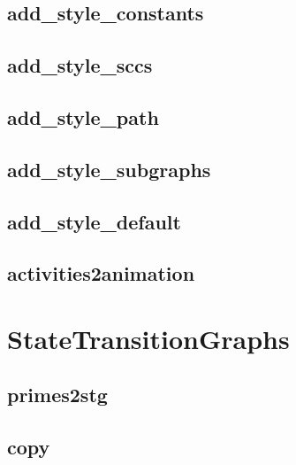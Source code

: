 \documentclass[letterpaper,10pt,english]{sphinxmanual}
\begin{document}
\subsection{add\_style\_constants}
\label{InteractionGraphs:id12}\label{InteractionGraphs:add-style-constants}

\subsection{add\_style\_sccs}
\label{InteractionGraphs:add-style-sccs}\label{InteractionGraphs:id13}

\subsection{add\_style\_path}
\label{InteractionGraphs:add-style-path}\label{InteractionGraphs:id14}

\subsection{add\_style\_subgraphs}
\label{InteractionGraphs:add-style-subgraphs}\label{InteractionGraphs:id15}

\subsection{add\_style\_default}
\label{InteractionGraphs:add-style-default}\label{InteractionGraphs:id16}

\subsection{activities2animation}
\label{InteractionGraphs:id17}\label{InteractionGraphs:activities2animation}

\section{StateTransitionGraphs}
\label{StateTransitionGraphs:statetransitiongraphs}\label{StateTransitionGraphs::doc}\label{StateTransitionGraphs:id1}

\subsection{primes2stg}
\label{StateTransitionGraphs:primes2stg}\label{StateTransitionGraphs:id2}

\subsection{copy}
\label{StateTransitionGraphs:stg-copy}\label{StateTransitionGraphs:copy}
\end{document}
